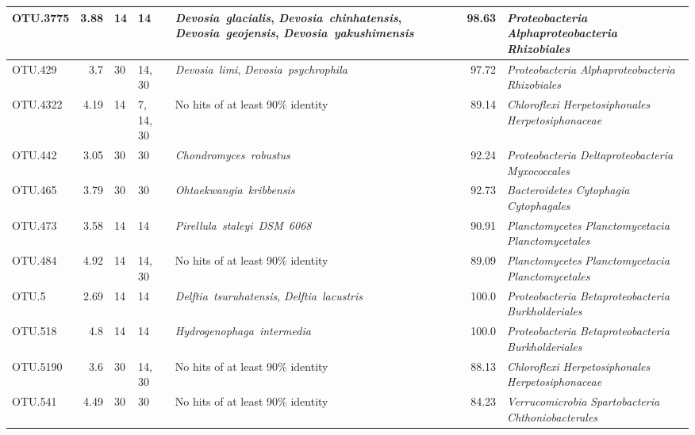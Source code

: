 \begin{ThreePartTable}
\begin{longtable}{P{1.5cm}rP{1cm}P{1.5cm}P{4cm}rP{5cm}}
OTU.3775 & 3.88 & 14 & 14&\mbox{\textit{Devosia glacialis}}, \mbox{\textit{Devosia chinhatensis}}, \mbox{\textit{Devosia geojensis}}, \mbox{\textit{Devosia yakushimensis}} & 98.63 & \mbox{\textit{Proteobacteria}} \mbox{\textit{Alphaproteobacteria}} \mbox{\textit{Rhizobiales}} \\ \midrule
OTU.429 & 3.7 & 30 & 14, 30&\mbox{\textit{Devosia limi}}, \mbox{\textit{Devosia psychrophila}} & 97.72 & \mbox{\textit{Proteobacteria}} \mbox{\textit{Alphaproteobacteria}} \mbox{\textit{Rhizobiales}} \\ \midrule
OTU.4322 & 4.19 & 14 & 7, 14, 30&{No hits of at least 90\% identity} & 89.14 & \mbox{\textit{Chloroflexi}} \mbox{\textit{Herpetosiphonales}} \mbox{\textit{Herpetosiphonaceae}} \\ \midrule
OTU.442 & 3.05 & 30 & 30&\mbox{\textit{Chondromyces robustus}} & 92.24 & \mbox{\textit{Proteobacteria}} \mbox{\textit{Deltaproteobacteria}} \mbox{\textit{Myxococcales}} \\ \midrule
OTU.465 & 3.79 & 30 & 30&\mbox{\textit{Ohtaekwangia kribbensis}} & 92.73 & \mbox{\textit{Bacteroidetes}} \mbox{\textit{Cytophagia}} \mbox{\textit{Cytophagales}} \\ \midrule
OTU.473 & 3.58 & 14 & 14&\mbox{\textit{Pirellula staleyi DSM 6068}} & 90.91 & \mbox{\textit{Planctomycetes}} \mbox{\textit{Planctomycetacia}} \mbox{\textit{Planctomycetales}} \\ \midrule
OTU.484 & 4.92 & 14 & 14, 30&{No hits of at least 90\% identity} & 89.09 & \mbox{\textit{Planctomycetes}} \mbox{\textit{Planctomycetacia}} \mbox{\textit{Planctomycetales}} \\ \midrule
OTU.5 & 2.69 & 14 & 14&\mbox{\textit{Delftia tsuruhatensis}}, \mbox{\textit{Delftia lacustris}} & 100.0 & \mbox{\textit{Proteobacteria}} \mbox{\textit{Betaproteobacteria}} \mbox{\textit{Burkholderiales}} \\ \midrule
OTU.518 & 4.8 & 14 & 14&\mbox{\textit{Hydrogenophaga intermedia}} & 100.0 & \mbox{\textit{Proteobacteria}} \mbox{\textit{Betaproteobacteria}} \mbox{\textit{Burkholderiales}} \\ \midrule
OTU.5190 & 3.6 & 30 & 14, 30&{No hits of at least 90\% identity} & 88.13 & \mbox{\textit{Chloroflexi}} \mbox{\textit{Herpetosiphonales}} \mbox{\textit{Herpetosiphonaceae}} \\ \midrule
OTU.541 & 4.49 & 30 & 30&{No hits of at least 90\% identity} & 84.23 & \mbox{\textit{Verrucomicrobia}} \mbox{\textit{Spartobacteria}} \mbox{\textit{Chthoniobacterales}} \\ \midrule

\end{longtable}
\end{ThreePartTable}

